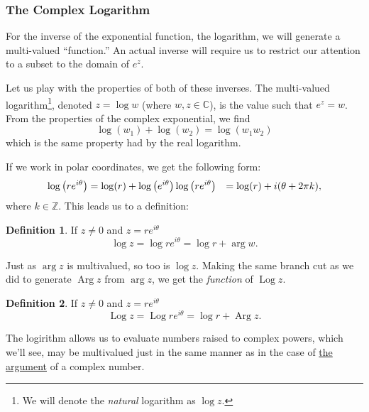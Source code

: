 \documentclass[10pt]{scrartcl}
\numberwithin{equation}{subsection}
\theoremstyle{definition}
\newtheorem{definition}{Definition}[section]
\theoremstyle{remark}
\newenvironment{definitionSR}
	{
		\begin{siderules}
			\begin{definition}
			}
			{
			\end{definition}
		\end{siderules}
	}
\DeclareMathOperator{\Log}{Log}
\newcommand{\Complex}{\mathbb{C}}
\DeclareMathOperator{\Arg}{Arg}
\begin{document}
\subsubsection {The Complex Logarithm}

For the inverse of the exponential function, the
logarithm, we will generate a multi-valued ``function.'' An actual inverse
will require us to restrict our attention to a subset to the domain of $e^z$.

Let us play with the properties of both of these inverses. The multi-valued 
logarithm\footnote{We will denote the \emph{natural} logarithm as $\log z$.},
denoted $z = \log w$ (where $w,z \in \Complex$), is the value such 
that $e^z = w$. From the properties of the complex exponential, we find 
\[
	\log(w_1) + \log(w_2) = \log(w_1 w_2)
\]
which is the same property had by the real logarithm.

If we work in polar coordinates, we
get the following form:
\begin{align*}
	\log\pqty{re^{i\theta}} &= \log(r) + \log\pqty{e^{i\theta}}
	\log\pqty{re^{i\theta}} &= \log(r) + i(\theta + 2\pi k),
\end{align*}
where $k\in \mathbb{Z}$. This leads us to a definition:
\begin{definitionSR}
	If $z\neq0$ and $z = re^{i\theta}$
	\[
		\log z = \log re^{i\theta} = \log r + \arg w.
	\]
\end{definitionSR}
Just as $\arg z$ is multivalued, so too is $\log z$. Making the same branch
cut as we did to generate $\Arg z$ from $\arg z$, we get the \emph{function} of
$\Log z$.
\begin{definitionSR}
	If $z\neq0$ and $z = re^{i\theta}$
	\[
		\Log z = \Log re^{i\theta} = \log r + \Arg z.
	\]
\end{definitionSR}

The logirithm allows us to evaluate numbers raised to complex powers, which we'll
see, may be multivalued just in the same manner as in the case of
\hyperref[argument]{the argument} of a complex number.
\end{document}
